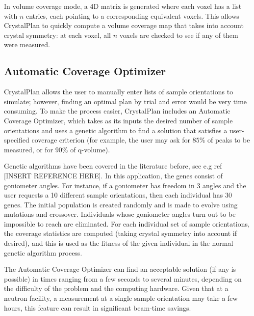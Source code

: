 \documentclass[final]{iucr}              %
\begin{document}
In volume coverage mode, a 4D matrix is generated where each voxel has a list
with $n$ entries, each pointing to a corresponding equivalent voxels. This
allows CrystalPlan to quickly compute a volume coverage map that takes into
account crystal symmetry: at each voxel, all $n$ voxels are checked to
see if any of them were measured. 



\subsection{Automatic Coverage Optimizer}

CrystalPlan allows the user to manually enter lists of sample orientations to
simulate; however, finding an optimal plan by trial and error would be very time
consuming. To make the process easier, CrystalPlan includes an Automatic
Coverage Optimizer, which takes as its inputs the desired number of sample
orientations and uses a genetic algorithm to find a solution that satisfies a
user-specified coverage criterion (for example, the user may ask for $85\%$ of
peaks to be measured, or for $90\%$ of q-volume).           

Genetic algorithms have been covered in the literature before, see e.g ref
[INSERT REFERENCE HERE]. In this application, the genes consist of goniometer
angles. For instance, if a goniometer has freedom in 3 angles and the user
requests a 10 different sample orientations, then each individual has 30 genes.
The initial population is created randomly and is made to evolve using mutations
and crossover. Individuals whose goniometer angles turn out to be impossible to
reach are eliminated. For each individual set of sample orientations, the
coverage statistics are computed (taking crystal symmetry into account if desired), and this is used as the fitness of the given individual in the normal genetic
algorithm process.             

The Automatic Coverage Optimizer can find an acceptable solution (if any is
possible) in times ranging from a few seconds to several minutes, depending on
the difficulty of the problem and the computing hardware. Given that at a
neutron facility, a measurement at a single sample orientation may take a few
hours, this feature can result in significant beam-time savings.           




\end{document}
